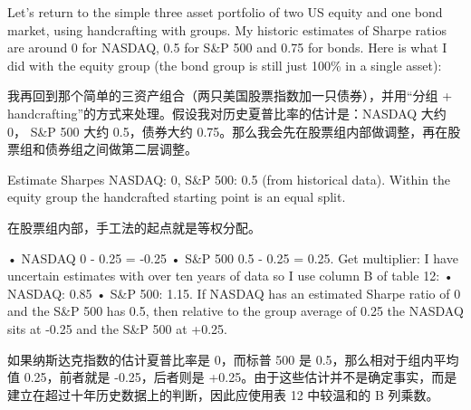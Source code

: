
\begin{englishblock} Let's return to the simple three asset portfolio of two US equity and one bond market, using handcrafting with groups. My historic estimates of Sharpe ratios are around 0 for NASDAQ, 0.5 for S\&P 500 and 0.75 for bonds. Here is what I did with the equity group (the bond group is still just 100\% in a single asset): \end{englishblock}

\begin{chineseblock}我再回到那个简单的三资产组合（两只美国股票指数加一只债券），并用“分组 + handcrafting”的方式来处理。假设我对历史夏普比率的估计是：NASDAQ 大约 0， S\&P 500 大约 0.5，债券大约 0.75。那么我会先在股票组内部做调整，再在股票组和债券组之间做第二层调整。\end{chineseblock}


\begin{englishblock} Estimate Sharpes NASDAQ: 0, S\&P 500: 0.5 (from historical data). Within the equity group the handcrafted starting point is an equal split. \end{englishblock}

\begin{chineseblock}在股票组内部，手工法的起点就是等权分配。\end{chineseblock}


\begin{englishblock}• NASDAQ 0 - 0.25 = -0.25 • S\&P 500 0.5 - 0.25 = 0.25. Get multiplier: I have uncertain estimates with over ten years of data so I use column B of table 12: • NASDAQ: 0.85 • S\&P 500: 1.15. If NASDAQ has an estimated Sharpe ratio of 0 and the S\&P 500 has 0.5, then relative to the group average of 0.25 the NASDAQ sits at -0.25 and the S\&P 500 at +0.25. \end{englishblock}

\begin{chineseblock}如果纳斯达克指数的估计夏普比率是 0，而标普 500 是 0.5，那么相对于组内平均值 0.25，前者就是 -0.25，后者则是 +0.25。由于这些估计并不是确定事实，而是建立在超过十年历史数据上的判断，因此应使用表 12 中较温和的 B 列乘数。\end{chineseblock}

